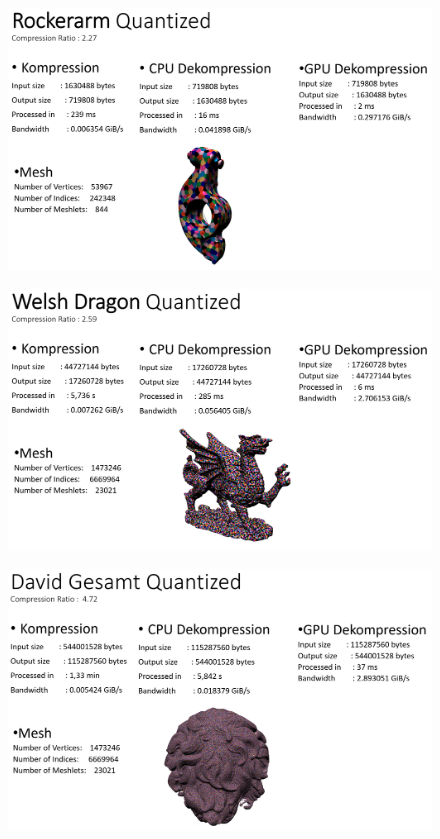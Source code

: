 \begin{figure}[h]
  \centering  
  \includegraphics[scale=0.28]{Bilder/ergebnisse_full/rockerarm_quantized.png}
\end{figure}
\begin{figure}[h]
  \centering  
  \includegraphics[scale=0.28]{Bilder/ergebnisse_full/welshdragon_quantized.png}
\end{figure}
\begin{figure}[h]
  \centering  
  \includegraphics[scale=0.28]{Bilder/ergebnisse_full/david_quantized.png}
\end{figure}
\clearpage
